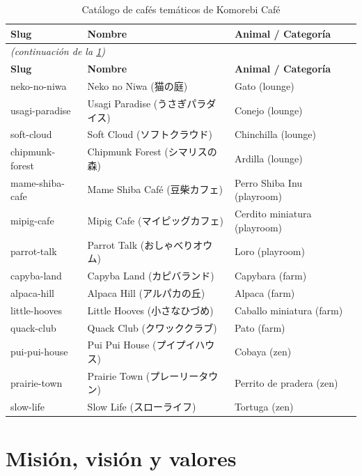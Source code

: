 \documentclass[12pt,a4paper,twoside,openright]{report}
\begin{document}
\begin{longtable}{@{}lll@{}}
  \caption{Catálogo de cafés temáticos de Komorebi Café}
  \label{tab:cafes}\\
  \toprule
  \textbf{Slug} & \textbf{Nombre} & \textbf{Animal / Categoría}\\
  \midrule
  \endfirsthead
  \multicolumn{3}{l}{\footnotesize\textit{(continuación de la \cref{tab:cafes})}}\\
  \toprule
  \textbf{Slug} & \textbf{Nombre} & \textbf{Animal / Categoría}\\
  \midrule
  \endhead
  \bottomrule
  \endfoot
  neko-no-niwa       & Neko no Niwa (猫の庭)         & Gato (lounge)\\
  usagi-paradise     & Usagi Paradise (うさぎパラダイス) & Conejo (lounge)\\
  soft-cloud         & Soft Cloud (ソフトクラウド)     & Chinchilla (lounge)\\
  chipmunk-forest    & Chipmunk Forest (シマリスの森)  & Ardilla (lounge)\\
  mame-shiba-cafe    & Mame Shiba Café (豆柴カフェ)   & Perro Shiba Inu (playroom)\\
  mipig-cafe         & Mipig Cafe (マイピッグカフェ)   & Cerdito miniatura (playroom)\\
  parrot-talk        & Parrot Talk (おしゃべりオウム)  & Loro (playroom)\\
  capyba-land        & Capyba Land (カピバランド)      & Capybara (farm)\\
  alpaca-hill        & Alpaca Hill (アルパカの丘)      & Alpaca (farm)\\
  little-hooves      & Little Hooves (小さなひづめ)   & Caballo miniatura (farm)\\
  quack-club         & Quack Club (クワッククラブ)     & Pato (farm)\\
  pui-pui-house      & Pui Pui House (プイプイハウス)  & Cobaya (zen)\\
  prairie-town       & Prairie Town (プレーリータウン) & Perrito de pradera (zen)\\
  slow-life          & Slow Life (スローライフ)        & Tortuga (zen)\\
\end{longtable}

\section{Misión, visión y valores}
\label{sec:valores}
\end{document}
